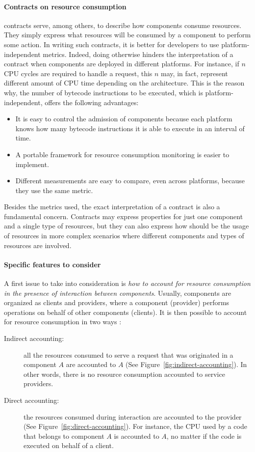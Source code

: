\paragraph{Contracts on resource consumption}
 contracts serve, among others, to describe how components consume resources.
They simply express what resources will be consumed by a component to perform some action. 
In writing such contracts, it is better for developers to use platform-independent metrics.
Indeed, doing otherwise hinders the interpretation of a contract when components are deployed in different platforms.
For instance, if $n$ CPU cycles are required to handle a request, this $n$ may, in fact, represent different amount of CPU time depending on the architecture.
This is the reason why, the number of bytecode instructions to be executed, which is platform-independent, offers the following advantages:
\begin{itemize}
\item It is easy to control the admission of components because each platform knows how many bytecode instructions it is able to execute in an interval of time.
\item A portable framework for resource consumption monitoring is easier to implement.
\item Different measurements are easy to compare, even across platforms, because they use the same metric.
\end{itemize}
Besides the metrics used, the exact interpretation of a contract is also a fundamental concern.
Contracts may express properties for just one component and a single type of resources, but they can also express how should be the usage of resources in more complex scenarios where different components and types of resources are involved.

\paragraph{Specific features to consider}
A first issue to take into consideration is \textit{how to account for resource consumption in the presence of interaction between components}.
Usually, components are organized as clients and providers, where a component (provider) performs operations on behalf of other components (clients).
It is then possible to account for resource consumption in two ways \cite{Miettinen2008,Maurel:2012:AME:2304736.2304763}:

\begin{description}

\item[Indirect accounting:] all the resources consumed to serve a request that was originated in a component $A$ are accounted to $A$ (See Figure~\ref{fig:indirect-accounting}).
In other words, there is no resource consumption accounted to service providers.

\item[Direct accounting:] the resources consumed during
interaction are accounted to the provider (See Figure~\ref{fig:direct-accounting}).
For instance, the CPU used by a code that belongs
to component $A$ is accounted to $A$, no matter if the code is executed on behalf of a client.
\end{description}

